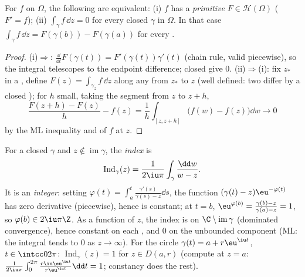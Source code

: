 \begin{proposition}[Primitives]\label{prop:b3:holomorphic:primitive}
For  $f$ on $\Omega$, the following are equivalent:
(i) $f$ has a \emph{primitive} $F \in \mathcal H(\Omega)$ ($F'
= f$); (ii) $\int_\gamma f\,\dd z = 0$ for every closed 
$\gamma$ in $\Omega$. In that case $\int_\gamma f\,\dd z =
F(\gamma(b)) - F(\gamma(a))$ for every .
\end{proposition}

\begin{proof}
(i)$\Rightarrow$: $\frac{\dd}{\dd t}F(\gamma(t)) =
F'(\gamma(t))\gamma'(t)$ (chain rule, valid piecewise), so the
integral telescopes to the endpoint difference; closed 
give $0$. (ii)$\Rightarrow$(i): fix $z_*$ in a , define $F(z) = \int_{\gamma_z}f\,\dd z$ along any
 from $z_*$ to $z$ (well defined: two  differ by a
closed ); for $h$ small, taking the segment from $z$ to
$z + h$,
\[
\frac{F(z + h) - F(z)}{h} - f(z)
= \frac1h\int_{[z, z+h]}\bigl(f(w) - f(z)\bigr)\dd w
\longrightarrow 0
\]
by the ML inequality and  of $f$ at $z$.
\end{proof}

\begin{definition}\label{def:b3:holomorphic:index}
For a closed  $\gamma$ and $z \notin
\operatorname{im}\gamma$, the \emph{index} is
\[
\operatorname{Ind}_\gamma(z) = \frac1{2\iu\pi}
\int_\gamma\frac{\dd w}{w - z} .
\]
It is an \emph{integer}: setting $\varphi(t) =
\int_a^t\frac{\gamma'(s)}{\gamma(s) - z}\dd s$, the function
$(\gamma(t) - z)\eu^{-\varphi(t)}$ has zero derivative
(piecewise), hence is constant; at $t = b$, $\eu^{\varphi(b)} =
\frac{\gamma(b) - z}{\gamma(a) - z} = 1$, so $\varphi(b) \in
2\iu\pi\Z$. As a function of $z$, the index is  on
$\C\setminus\operatorname{im}\gamma$ (dominated convergence),
hence constant on each , and $0$ on the
unbounded component (ML: the integral tends to $0$ as $z \to
\infty$). For the circle $\gamma(t) = a + r\eu^{\iu t}$, $t
\in \intcc0{2\pi}$: $\operatorname{Ind}_\gamma(z) = 1$ for $z
\in D(a,r)$ (compute at $z = a$: $\frac1{2\iu\pi}
\int_0^{2\pi}\frac{r\iu\eu^{\iu t}}{r\eu^{\iu t}}\dd t = 1$;
constancy does the rest).
\end{definition}

